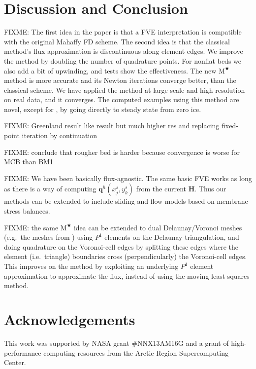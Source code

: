 \documentclass[twocolumn,letterpaper]{igs}
\newcommand\bq{\mathbf{q}}
\newcommand\bH{\mathbf{H}}
\newcommand{\Mstar}{$\text{M}^{\bigstar}$\xspace}
\begin{document}
\section{Discussion and Conclusion} \label{sec:conclusion}

FIXME: The first idea in the paper is that a FVE interpretation is compatible with the original Mahaffy FD scheme.  The second idea is that the classical method's flux approximation is discontinuous along element edges.  We improve the method by doubling the number of quadrature points.  For nonflat beds we also add a bit of upwinding, and tests show the effectiveness.  The new \Mstar method is more accurate and its Newton iterations converge better, than the classical scheme.  We have applied the method at large scale and high resolution on real data, and it converges.  The computed examples using this method are novel, except for \cite{JouvetBueler2012}, by going directly to steady state from zero ice.

FIXME: Greenland result like \cite{JouvetBueler2012} result but much higher res and replacing fixed-point iteration by continuation 

FIXME: conclude that rougher bed is harder because convergence is worse for MCB than BM1

FIXME: We have been basically flux-agnostic.  The same basic FVE works as long as there is a way of computing $\bq^h(x_j^s,y_k^s)$ from the current $\bH$.  Thus our methods can be extended to include sliding and flow models based on membrane stress balances. 

FIXME: the same \Mstar idea can be extended to dual Delaunay/Voronoi meshes (e.g.~the meshes from \cite{EgholmNielsen2010,Ringleretal2013}) using $P^1$ elements on the Delaunay triangulation, and doing quadrature on the Voronoi-cell edges by splitting these edges where the element (i.e.~triangle) boundaries cross (perpendicularly) the Voronoi-cell edges.  This improves on the \cite{EgholmNielsen2010} method by exploiting an underlying $P^1$ element approximation to approximate the flux, instead of using the moving least squares method.

\section*{Acknowledgements}
This work was supported by NASA grant \#NNX13AM16G and a grant of high-performance computing resources from the Arctic Region Supercomputing Center.




\end{document}
